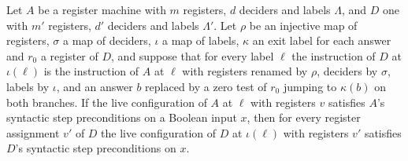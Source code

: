 \begin{lemma}
\label{Complexity.LogProg.preS_embed}
\leanok
{}
Let $A$ be a register machine with $m$ registers, $d$ deciders and labels $\Lambda$, and $D$ one
with $m'$ registers, $d'$ deciders and labels $\Lambda'$. Let $\rho$ be an injective map of
registers, $\sigma$ a map of deciders, $\iota$ a map of labels, $\kappa$ an exit label for each
answer and $r_0$ a register of $D$, and suppose that for every label $\ell$ the instruction of
$D$ at $\iota(\ell)$ is the instruction of $A$ at $\ell$ with registers renamed by $\rho$,
deciders by $\sigma$, labels by $\iota$, and an answer $b$ replaced by a zero test of $r_0$
jumping to $\kappa(b)$ on both branches. If the live configuration of $A$ at $\ell$ with
registers $v$ satisfies $A$'s syntactic step preconditions on a Boolean input $x$, then for
every register assignment $v'$ of $D$ the live configuration of $D$ at $\iota(\ell)$ with
registers $v'$ satisfies $D$'s syntactic step preconditions on $x$.
\end{lemma}

